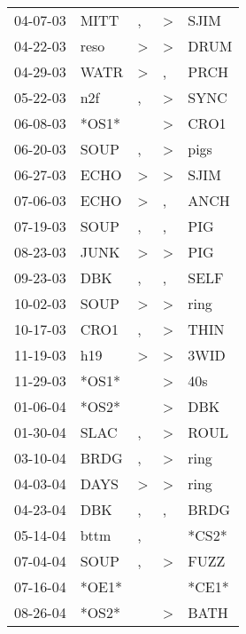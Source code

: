 \begin{supertabular}{lllll}
 04-07-03 &   MITT &                , &     \textgreater &   SJIM \\
 04-22-03 &   reso &     \textgreater &     \textgreater &   DRUM \\
 04-29-03 &   WATR &     \textgreater &                , &   PRCH \\
 05-22-03 &    n2f &                , &     \textgreater &   SYNC \\
 06-08-03 &  *OS1* &                  &     \textgreater &   CRO1 \\
 06-20-03 &   SOUP &                , &     \textgreater &   pigs \\
 06-27-03 &   ECHO &     \textgreater &     \textgreater &   SJIM \\
 07-06-03 &   ECHO &     \textgreater &                , &   ANCH \\
 07-19-03 &   SOUP &                , &                , &    PIG \\
 08-23-03 &   JUNK &     \textgreater &     \textgreater &    PIG \\
 09-23-03 &    DBK &                , &                , &   SELF \\
 10-02-03 &   SOUP &     \textgreater &     \textgreater &   ring \\
 10-17-03 &   CRO1 &                , &     \textgreater &   THIN \\
 11-19-03 &    h19 &     \textgreater &     \textgreater &   3WID \\
 11-29-03 &  *OS1* &                  &     \textgreater &    40s \\
 01-06-04 &  *OS2* &                  &     \textgreater &    DBK \\
 01-30-04 &   SLAC &                , &     \textgreater &   ROUL \\
 03-10-04 &   BRDG &                , &     \textgreater &   ring \\
 04-03-04 &   DAYS &     \textgreater &     \textgreater &   ring \\
 04-23-04 &    DBK &                , &                , &   BRDG \\
 05-14-04 &   bttm &                , &                  &  *CS2* \\
 07-04-04 &   SOUP &                , &     \textgreater &   FUZZ \\
 07-16-04 &  *OE1* &                  &                  &  *CE1* \\
 08-26-04 &  *OS2* &                  &     \textgreater &   BATH \\

\end{supertabular}
